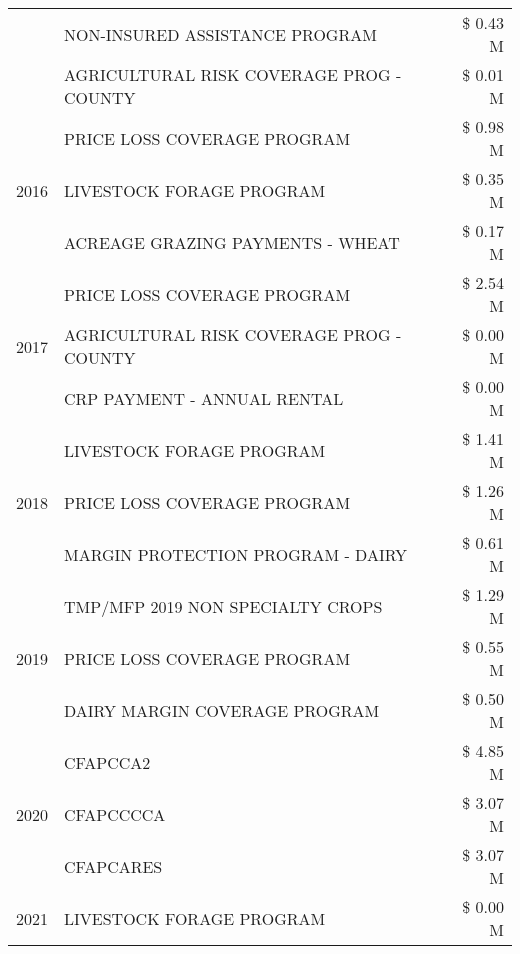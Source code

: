 \begin{tabular}{llr}
 & NON-INSURED ASSISTANCE PROGRAM & \$ 0.43 M \\
 & AGRICULTURAL RISK COVERAGE PROG - COUNTY & \$ 0.01 M \\
\cline{1-3}
\multirow[t]{3}{*}{2016} & PRICE LOSS COVERAGE PROGRAM & \$ 0.98 M \\
 & LIVESTOCK FORAGE PROGRAM & \$ 0.35 M \\
 & ACREAGE GRAZING PAYMENTS - WHEAT & \$ 0.17 M \\
\cline{1-3}
\multirow[t]{3}{*}{2017} & PRICE LOSS COVERAGE PROGRAM & \$ 2.54 M \\
 & AGRICULTURAL RISK COVERAGE PROG - COUNTY & \$ 0.00 M \\
 & CRP PAYMENT - ANNUAL RENTAL & \$ 0.00 M \\
\cline{1-3}
\multirow[t]{3}{*}{2018} & LIVESTOCK FORAGE PROGRAM & \$ 1.41 M \\
 & PRICE LOSS COVERAGE PROGRAM & \$ 1.26 M \\
 & MARGIN PROTECTION PROGRAM - DAIRY & \$ 0.61 M \\
\cline{1-3}
\multirow[t]{3}{*}{2019} & TMP/MFP 2019 NON SPECIALTY CROPS & \$ 1.29 M \\
 & PRICE LOSS COVERAGE PROGRAM & \$ 0.55 M \\
 & DAIRY MARGIN COVERAGE PROGRAM & \$ 0.50 M \\
\cline{1-3}
\multirow[t]{3}{*}{2020} & CFAPCCA2 & \$ 4.85 M \\
 & CFAPCCCCA & \$ 3.07 M \\
 & CFAPCARES & \$ 3.07 M \\
\cline{1-3}
2021 & LIVESTOCK FORAGE PROGRAM & \$ 0.00 M \\
\cline{1-3}
\bottomrule
\end{tabular}
